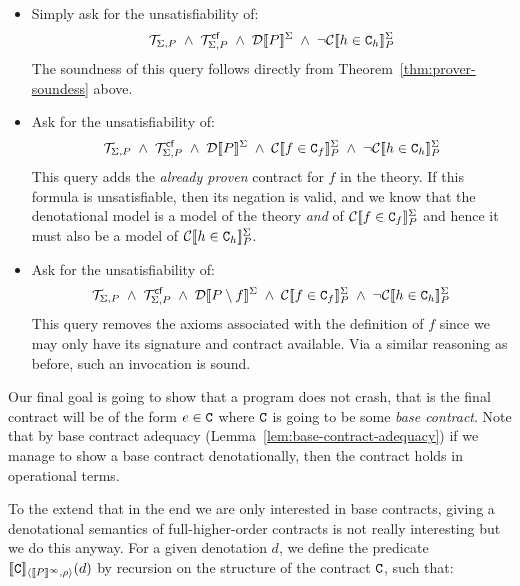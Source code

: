 \documentclass[preprint,nocopyrightspace,draft]{sigplanconf}
\begin{document}
\begin{itemize}
  \item Simply ask for the unsatisfiability of: 
    \[  \Th{\Sigma}{P}\;\land\;
        \Th{\Sigma}{P}^{\lcfZ}\;\land\;\dtrans{\Sigma}{P}\;\land\;\neg\ctrans{\Sigma}{P}{h \in \Ct_h} \] 
        The soundness of this query follows directly from Theorem~\ref{thm:prover-soundess} above.

  \item Ask for the unsatisfiability of:
    \[  \Th{\Sigma}{P}\;\land\;
        \Th{\Sigma}{P}^{\lcfZ}\;\land\;\dtrans{\Sigma}{P}\;\land\;\ctrans{\Sigma}{P}{f \in \Ct_f}\;\land\;\neg\ctrans{\Sigma}{P}{h \in \Ct_h}     \] 
        This query adds the {\em already proven} contract for $f$ in the theory. If this formula
        is unsatisfiable, then its negation is valid, and we know that the denotational model is 
        a model of the theory {\em and} of $\ctrans{\Sigma}{P}{f \in \Ct_f}$ and hence it must also
        be a model of $\ctrans{\Sigma}{P}{h \in \Ct_h}$. 
  \item Ask for the unsatisfiability of:
    \[  \Th{\Sigma}{P}\;\land\;
        \Th{\Sigma}{P}^{\lcfZ}\;\land\;\dtrans{\Sigma}{P \setminus f}\;\land\;\ctrans{\Sigma}{P}{f \in \Ct_f}\;\land\;
        \neg\ctrans{\Sigma}{P}{h \in \Ct_h}     \] 
        This query removes the axioms associated with the definition of $f$ since we may only have 
        its signature and contract available. Via a similar reasoning as before, such an invocation 
        is sound.
\end{itemize}

Our final goal is going to show that a program does not crash, that
is the final contract will be of the form $e \in \Ct$ where $\Ct$ is
going to be some {\em base contract}. Note that by base contract adequacy
(Lemma~\ref{lem:base-contract-adequacy}) if we manage to show a base contract 
denotationally, then the contract holds in operational terms.

To the extend that in the end we are only interested in base contracts, giving a 
denotational semantics of full-higher-order contracts is not really interesting 
but we do this anyway. For a given denotation $d$, we define the 
predicate $\interp{\Ct}{\dbrace{P}^\infty}{\rho}(d)$ by recursion on the structure 
of the contract $\Ct$, such that:
\end{document}
